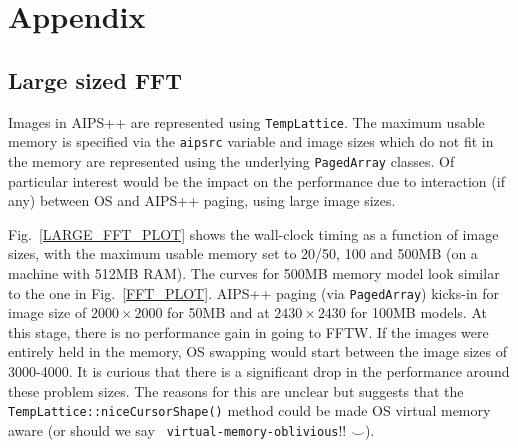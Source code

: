 \newpage
\appendix{}


\section{Appendix}
\subsection{Large sized FFT}
\label{A:PAGED_FFT}

Images in AIPS++ are represented using {\tt TempLattice}.  The maximum
usable memory is specified via the {\tt aipsrc} variable and image
sizes which do not fit in the memory are represented using the
underlying {\tt PagedArray} classes.  Of particular interest would be
the impact on the performance due to interaction (if any) between OS
and AIPS++ paging, using large image sizes.

Fig.~\ref{LARGE_FFT_PLOT} shows the wall-clock timing as a function of
image sizes, with the maximum usable memory set to 20/50, 100 and
500MB (on a machine with 512MB RAM).  The curves for 500MB memory
model look similar to the one in Fig.~\ref{FFT_PLOT}.  AIPS++ paging
(via {\tt PagedArray}) kicks-in for image size of $2000\times2000$ for
50MB and at $2430\times2430$ for 100MB models.  At this stage, there
is no performance gain in going to FFTW.  If the images were entirely
held in the memory, OS swapping would start between the image sizes of
3000-4000.  It is curious that there is a significant drop in the
performance around these problem sizes.  The reasons for this are
unclear but suggests that the {\tt TempLattice::niceCursorShape()}
method could be made OS virtual memory aware (or should we say {\tt
virtual-memory-oblivious}!! $\smile$).


